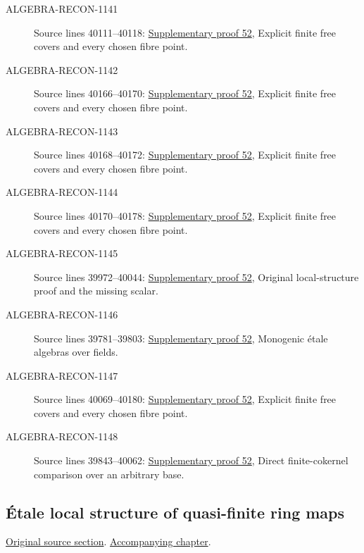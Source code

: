 \begin{description}
\item[ALGEBRA-RECON-1141] Source lines 40111--40118: \hyperlink{algebra_etale_local_notes_20260928}{Supplementary proof 52}, Explicit finite free covers and every chosen fibre point.
\item[ALGEBRA-RECON-1142] Source lines 40166--40170: \hyperlink{algebra_etale_local_notes_20260928}{Supplementary proof 52}, Explicit finite free covers and every chosen fibre point.
\item[ALGEBRA-RECON-1143] Source lines 40168--40172: \hyperlink{algebra_etale_local_notes_20260928}{Supplementary proof 52}, Explicit finite free covers and every chosen fibre point.
\item[ALGEBRA-RECON-1144] Source lines 40170--40178: \hyperlink{algebra_etale_local_notes_20260928}{Supplementary proof 52}, Explicit finite free covers and every chosen fibre point.
\item[ALGEBRA-RECON-1145] Source lines 39972--40044: \hyperlink{algebra_etale_local_notes_20260928}{Supplementary proof 52}, Original local-structure proof and the missing scalar.
\item[ALGEBRA-RECON-1146] Source lines 39781--39803: \hyperlink{algebra_etale_local_notes_20260928}{Supplementary proof 52}, Monogenic étale algebras over fields.
\item[ALGEBRA-RECON-1147] Source lines 40069--40180: \hyperlink{algebra_etale_local_notes_20260928}{Supplementary proof 52}, Explicit finite free covers and every chosen fibre point.
\item[ALGEBRA-RECON-1148] Source lines 39843--40062: \hyperlink{algebra_etale_local_notes_20260928}{Supplementary proof 52}, Direct finite-cokernel comparison over an arbitrary base.
\end{description}

\subsection{\'Etale local structure of quasi-finite ring maps}
\hypertarget{algebra-source-section-etale-local-quasi-finite}{}
\noindent\href{https://github.com/stacks/stacks-project/blob/a04446e57ec1fbc252a871afcec7752fb2807b14/algebra.tex\#L40188}{Original source section}. \href{algebra.pdf\#nameddest=section-etale-local-quasi-finite}{Accompanying chapter}.

